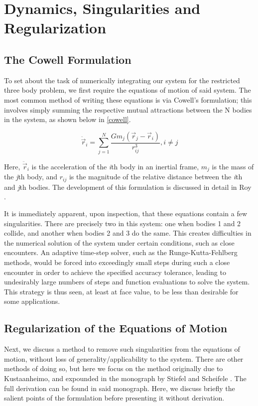 \documentclass[11pt,twoside,letterpaper]{article}
\begin{document}
  \section{Dynamics, Singularities and Regularization}
  
  \subsection {The Cowell Formulation} 
  To set about the task of numerically integrating our system for the
  restricted three body problem, we first require the equations of
  motion of said system. The most common method of writing these
  equations is via Cowell's formulation; this involves simply summing
  the respective mutual attractions between the N bodies in the
  system, as shown below in \ref{cowell}. 
  
  \begin{equation} \label{cowell}
    \ddot{\vec{r}}_i = \sum_{j=1}^{N} \frac{Gm_j\left(\vec{r}_j - \vec{r}_i\right)}{r_{ij}^3} , i \neq j
  \end{equation}

  Here, \(\ddot{\vec{r}}_i\) is the acceleration of the \textit{i}th
  body in an inertial frame, \(m_j\) is the mass of the \textit{j}th
  body, and \(r_{ij}\) is the magnitude of the relative distance
  between the \textit{i}th and \textit{j}th bodies. The development of
  this formulation is discussed in detail in Roy \cite{roy_2017}.

  It is immediately apparent, upon inspection, that these equations
  contain a few singularities. There are precisely two in this system:
  one when bodies 1 and 2 collide, and another when bodies 2 and 3 do
  the same. This creates difficulties in the numerical solution of the
  system under certain conditions, such as close encounters. An
  adaptive time-step solver, such as the Runge-Kutta-Fehlberg methods,
  would be forced into exceedingly small steps during such a close
  encounter in order to achieve the specified accuracy tolerance,
  leading to undesirably large numbers of steps and function
  evaluations to solve the system. This strategy is thus seen, at
  least at face value, to be less than desirable for some
  applications.
  
  \subsection {Regularization of the Equations of Motion}
  Next, we discuss a method to remove such singularities from the
  equations of motion, without loss of generality/applicability to the
  system. There are other methods of doing so, but here we focus on
  the method originally due to Kustaanheimo, and expounded in the
  monograph by Stiefel and Scheifele \cite{stiefel_1971}. The full
  derivation can be found in said monograph. Here, we discuss briefly
  the salient points of the formulation before presenting it without
  derivation.
\end{document}
